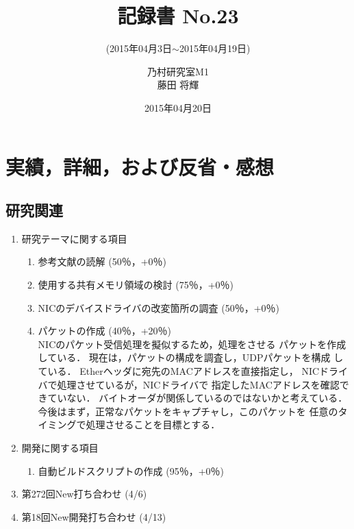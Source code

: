 \documentclass[fleqn, 12pt]{extarticlej}
\subtitle{(2015年04月3日$\sim$2015年04月19日)}
\author{乃村研究室M1\\藤田 将輝}
\date{2015年04月20日}
\title{記録書 No.23}
\begin{document}
\maketitle
\section{実績，詳細，および反省・感想}
\subsection{研究関連}
\label{sec-2-1}
\begin{enumerate}
    \item 研究テーマに関する項目
    \hfill
    \label{enum-research1}
    \begin{enumerate}
        \item 参考文献の読解
        \hfill
        \label{enum-1-A}
        (50％，+0％)
        \item 使用する共有メモリ領域の検討
        \hfill
        \label{enum-1-B}
        (75％，+0％)
        \item NICのデバイスドライバの改変箇所の調査
        \hfill
        \label{enum-1-C}
        (50％，+0％)
        \item パケットの作成
        \hfill
        \label{enum-1-D}
        (40％，+20％)\\
        NICのパケット受信処理を擬似するため，処理をさせる
        パケットを作成している．
        現在は，パケットの構成を調査し，UDPパケットを構成
        している．
        Etherヘッダに宛先のMACアドレスを直接指定し，
        NICドライバで処理させているが，NICドライバで
        指定したMACアドレスを確認できていない．
        バイトオーダが関係しているのではないかと考えている．
        今後はまず，正常なパケットをキャプチャし，このパケットを
        任意のタイミングで処理させることを目標とする．

    \end{enumerate}
    \item 開発に関する項目
    \hfill
    \label{enum-research2}
    \begin{enumerate}

        \item 自動ビルドスクリプトの作成
        \hfill
        \label{enum-2-A}
        (95％，+0％)
    \end{enumerate}
    \item 第272回New打ち合わせ 
    \hfill
    \label{enum-research3}
    (4/6)
    \item 第18回New開発打ち合わせ 
    \hfill
    \label{enum-research3}
    (4/13)

\end{enumerate}
\end{document}
